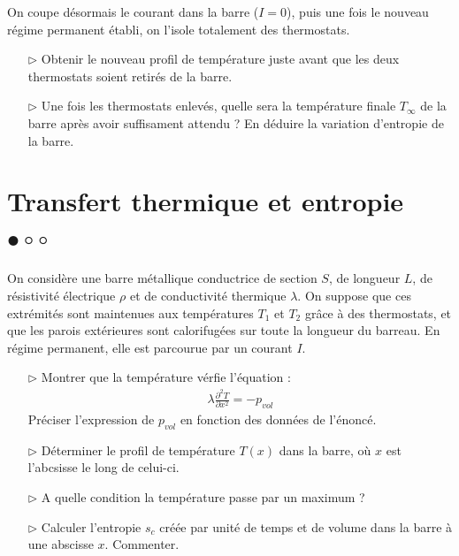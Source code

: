 \documentclass{report}
\begin{document}
On coupe désormais le courant dans la barre ($I=0$), puis une fois le nouveau régime permanent établi, on l'isole totalement des thermostats.

\begin{itemize}
		
	\item[$\triangleright$] Obtenir le nouveau profil de température juste avant que les deux thermostats soient retirés de la barre.
	
	\item[$\triangleright$] Une fois les thermostats enlevés, quelle sera la température finale $T_\infty$ de la barre après avoir suffisament attendu ? En déduire la variation d'entropie de la barre.
	
\end{itemize}

\newpage

\section*{Transfert thermique et entropie $\bullet\circ\circ$}

On considère une barre métallique conductrice de section $S$, de longueur $L$, de résistivité électrique $\rho$ et de conductivité thermique $\lambda$. On suppose que ces extrémités sont maintenues aux températures $T_1$ et $T_2$ grâce à des thermostats, et que les parois extérieures sont calorifugées sur toute la longueur du barreau. En régime permanent, elle est parcourue par un courant $I$.

\begin{itemize}

	\item[$\triangleright$] Montrer que la température vérfie l'équation : 
		\begin{align*}
	  \lambda\frac{\partial^2 T}{\partial x^2} = - p_{vol}
	\end{align*}	
	Préciser l'expression de $p_{vol}$ en fonction des données de l'énoncé.

	\item[$\triangleright$] Déterminer le profil de température $T(x)$ dans la barre, où $x$ est l'abcsisse le long de celui-ci.
	
	\item[$\triangleright$] A quelle condition la température passe par un maximum ? 
	
	\item[$\triangleright$] Calculer l'entropie $s_c$ créée par unité de temps et de volume dans la barre à une abscisse $x$. Commenter.

\end{itemize}
\end{document}
